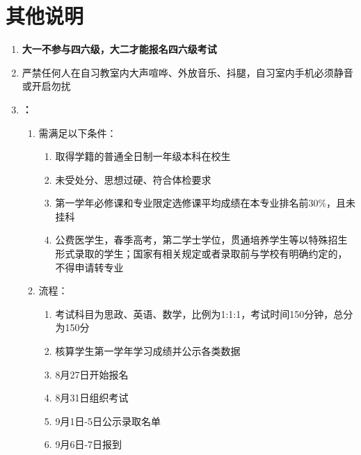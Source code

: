 \section[其他说明]{其他说明}
\begin{enumerate}
      \item \textbf{大一不参与四六级，大二才能报名四六级考试}
      \item 严禁任何人在自习教室内大声喧哗、外放音乐、抖腿，自习室内手机必须静音或开启勿扰
      \item \textbf{\footnotemark：}
            \begin{enumerate}
                  \item 需满足以下条件：
                        \begin{enumerate}
                              \item 取得学籍的普通全日制一年级本科在校生
                              \item 未受处分、思想过硬、符合体检要求
                              \item 第一学年必修课和专业限定选修课平均成绩在本专业排名前30\%，且未挂科
                              \item 公费医学生，春季高考，第二学士学位，贯通培养学生等以特殊招生形式录取的学生；国家有相关规定或者录取前与学校有明确约定的，不得申请转专业
                        \end{enumerate}
                  \item 流程：
                        \begin{enumerate}
                              \item 考试科目为思政、英语、数学，比例为1:1:1，考试时间150分钟，总分为150分
                              \item 核算学生第一学年学习成绩并公示各类数据
                              \item 8月27日开始报名
                              \item 8月31日组织考试
                              \item 9月1日-5日公示录取名单\footnotemark
                              \item 9月6日-7日报到
                        \end{enumerate}

\end{enumerate}
\end{enumerate}
